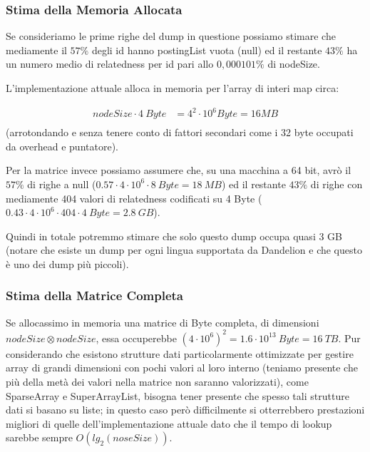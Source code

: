 \subsubsection{Stima della Memoria Allocata}
Se consideriamo le prime righe del dump in questione possiamo stimare che mediamente il $57\%$ degli id hanno postingList vuota (null) ed il restante $43\%$ ha un numero 
medio di relatedness per id pari allo $0,000101\%$ di nodeSize.

L'implementazione attuale alloca in memoria per l'array di interi map circa:
\begin{center}
\begin{equation}\begin{split} 
    nodeSize \cdot 4\ Byte & = 4^2 \cdot 10^6 Byte = 16 MB \\
\end{split}\end{equation}
(arrotondando e senza tenere conto di fattori secondari come i 32 byte occupati da overhead e puntatore).
\end{center}
Per la matrice invece possiamo assumere che, su una macchina a 64 bit, avrò il $57\%$ di righe a null ($0.57 \cdot 4\cdot 10^6 \cdot 8\ Byte = 18\ MB$) ed il 
restante $43\%$ di righe con mediamente 404 valori di relatedness codificati su 4 Byte ($0.43 \cdot 4 \cdot 10^6 \cdot 404 \cdot 4\ Byte = 2.8\ GB$). 

Quindi in totale potremmo stimare che solo questo dump occupa quasi 3 GB (notare che esiste un dump per ogni lingua supportata da Dandelion e che questo è uno 
dei dump più piccoli).

\subsubsection{Stima della Matrice Completa}
Se allocassimo in memoria una matrice di Byte completa, di dimensioni $nodeSize \otimes nodeSize$, essa occuperebbe $(4 \cdot 10^6)^2 = 1.6 \cdot 10^{13}\ Byte = 16\ TB$.
Pur considerando che esistono strutture dati particolarmente ottimizzate per gestire array di grandi dimensioni con pochi valori al loro interno (teniamo presente che
più della metà dei valori nella matrice non saranno valorizzati), come SparseArray e SuperArrayList, bisogna tener presente che spesso tali strutture dati 
si basano su liste; in questo caso però difficilmente si otterrebbero prestazioni migliori di quelle dell'implementazione attuale dato che il tempo di lookup 
sarebbe sempre $O(lg_2(noseSize))$. 

